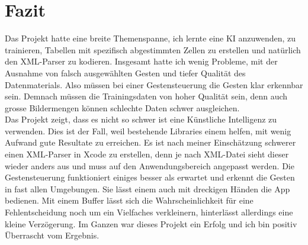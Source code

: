 \documentclass[12pt]{article}
\begin{document}
\section{Fazit}
Das Projekt hatte eine breite Themenspanne, ich lernte eine KI anzuwenden, zu trainieren, Tabellen mit spezifisch abgestimmten Zellen zu erstellen und natürlich den XML-Parser zu kodieren. Insgesamt hatte ich wenig Probleme, mit der Ausnahme von falsch ausgewählten Gesten und tiefer Qualität des Datenmaterials. Also müssen bei einer Gestensteuerung die Gesten klar erkennbar sein. Demnach müssen die Trainingsdaten von hoher Qualität sein, denn auch grosse Bildermengen können schlechte Daten schwer ausgleichen. \\ Das Projekt zeigt, dass es nicht  so schwer ist eine Künstliche Intelligenz zu verwenden. Dies ist der Fall, weil bestehende Libraries einem helfen, mit wenig Aufwand gute Resultate zu erreichen. Es ist nach meiner Einschätzung schwerer einen XML-Parser in Xcode zu erstellen, denn je nach XML-Datei sieht dieser wieder anders aus und muss auf den Anwendungsbereich angepasst werden. Die Gestensteuerung funktioniert einiges besser als erwartet und erkennt die Gesten in fast allen Umgebungen. Sie lässt einem auch mit dreckigen Händen die App bedienen. Mit einem Buffer lässt sich die Wahrscheinlichkeit für eine Fehlentscheidung noch um ein Vielfaches verkleinern, hinterlässt allerdings eine kleine Verzögerung. Im Ganzen war dieses Projekt ein Erfolg und ich bin positiv Überrascht vom Ergebnis.


\renewcommand\refname{Bibliografie}
\newpage

\end{document}
